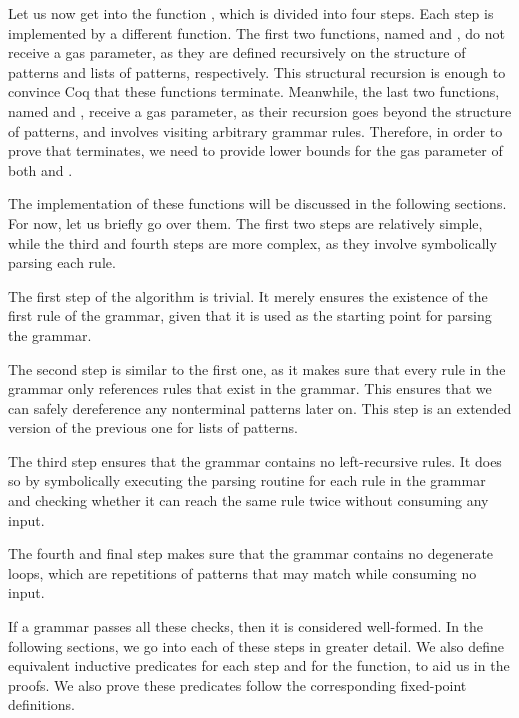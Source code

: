 Let us now get into the function \textit{\verifygrammarname{}},
which is divided into four steps.
Each step is implemented by a different function.
The first two functions,
named \textit{\coherentname{}} and \textit{\lcoherentname{}},
do not receive a gas parameter,
as they are defined recursively on the structure of patterns
and lists of patterns, respectively.
This structural recursion is enough to convince Coq
that these functions terminate.
Meanwhile, the last two functions,
named \textit{\lverifyrulename{}} and \textit{\lcheckloopsname{}},
receive a gas parameter,
as their recursion goes beyond the structure of patterns,
and involves visiting arbitrary grammar rules.
Therefore, in order to prove that \textit{\verifygrammarname{}} terminates,
we need to provide lower bounds for the gas parameter of both
\textit{\lverifyrulename{}} and \textit{\lcheckloopsname{}}.

The implementation of these functions
will be discussed in the following sections.
For now, let us briefly go over them.
The first two steps are relatively simple,
while the third and fourth steps are more complex,
as they involve symbolically parsing each rule.

The first step of the algorithm is trivial.
It merely ensures the existence of
the first rule of the grammar,
given that it is used as the starting point
for parsing the grammar.

The second step is similar to the first one,
as it makes sure that every rule in the grammar
only references rules that exist in the grammar.
This ensures that we can safely
dereference any nonterminal patterns later on.
This step is an extended version of the previous one
for lists of patterns.

The third step
ensures that the grammar contains no
left-recursive rules.
It does so by symbolically executing the parsing routine
for each rule in the grammar
and checking whether it can reach the same rule twice
without consuming any input.

The fourth and final step
makes sure that the grammar contains
no degenerate loops,
which are repetitions of patterns
that may match while consuming no input.

If a grammar passes all these checks,
then it is considered well-formed.
In the following sections,
we go into each of these steps
in greater detail.
We also define equivalent inductive predicates
for each step and for the \textit{\verifygrammarname{}} function,
to aid us in the proofs.
We also prove these predicates
follow the corresponding fixed-point definitions.







